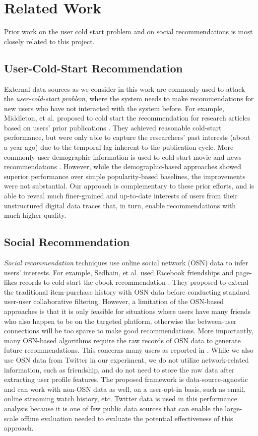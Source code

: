 \documentclass[conference]{IEEEtran}
\begin{document}
\section{Related Work}
Prior work on the user cold start problem and on social recommendations is most closely related to this project. 
\subsection{User-Cold-Start Recommendation}
External data sources as we consider in this work are commonly used to attack the \textit{user-cold-start problem}, where the system needs to make recommendations for new users who have not interacted with the system before. For example, Middleton, et al. proposed to cold start the recommendation for research articles based on users' prior publications \cite{Middleton:2004}. They achieved reasonable cold-start performance, but were only able to capture the researchers' past interests (about a year ago) due to the temporal lag inherent to the publication cycle. More commonly user demographic information is used to cold-start movie and news recommendations \cite{Agarwal:2009,Park:2009}. However, while the demographic-based approaches showed superior performance over simple popularity-based baselines, the improvements were not substantial. Our approach is complementary to these prior efforts, and is able to reveal much finer-grained and up-to-date interests of users from their unstructured digital data traces that, in turn, enable recommendations with much higher quality.

\subsection{Social Recommendation}
\textit{Social recommendation} techniques use online social network (OSN) data to infer users' interests. For example, Sedhain, et al. used Facebook friendships and page-likes records to cold-start the ebook recommendation \cite{Sedhain:2014:SCF}. They proposed to extend the traditional item-purchase history with OSN data before conducting standard user-user collaborative filtering. However, a limitation of the OSN-based approaches is that it is only feasible for situations where users have many friends who also happen to be on the targeted platform, otherwise the between-user connections will be too sparse to make good recommendations. More importantly, many OSN-based algorithms require the raw records of OSN data to generate future recommendations. This concerns many users as reported in \cite{Sedhain:2013}. While we also use OSN data from Twitter in our experiment, we do not utilize network-related information, such as friendship, and do not need to store the raw data after extracting user profile features. The proposed framework is data-source-agnostic and can work with non-OSN data as well, on a user-opt-in basis, such as email, online streaming watch history, etc. Twitter data is used in this performance analysis because it is one of few public data sources that can enable the large-scale offline evaluation needed to evaluate the potential effectiveness of this approach.
\end{document}
